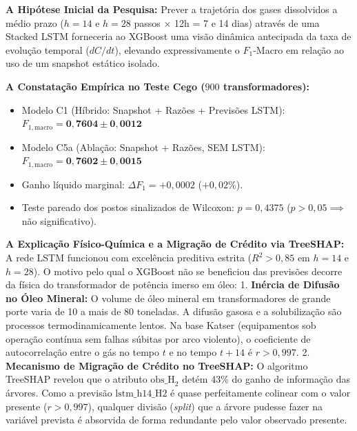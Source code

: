 \documentclass[10pt,a4paper]{article}
\begin{document}
\begin{defesabox}
\textbf{A Hipótese Inicial da Pesquisa:} Prever a trajetória dos gases dissolvidos a médio prazo ($h=14$ e $h=28$ passos $\times$ 12h = 7 e 14 dias) através de uma Stacked LSTM forneceria ao XGBoost uma visão dinâmica antecipada da taxa de evolução temporal ($dC/dt$), elevando expressivamente o $F_1$-Macro em relação ao uso de um snapshot estático isolado.

\textbf{A Constatação Empírica no Teste Cego ($900$ transformadores):}
\begin{itemize}[leftmargin=*,itemsep=1pt]
  \item Modelo C1 (Híbrido: Snapshot + Razões + Previsões LSTM): $F_{1,\text{macro}} = \mathbf{0,7604 \pm 0,0012}$
  \item Modelo C5a (Ablação: Snapshot + Razões, SEM LSTM): $F_{1,\text{macro}} = \mathbf{0,7602 \pm 0,0015}$
  \item Ganho líquido marginal: $\Delta F_1 = +0,0002$ ($+0,02\%$).
  \item Teste pareado dos postos sinalizados de Wilcoxon: $p = 0,4375$ ($p > 0,05 \implies$ não significativo).
\end{itemize}

\textbf{A Explicação Físico-Química e a Migração de Crédito via TreeSHAP:}
A rede LSTM funcionou com excelência preditiva estrita ($R^2 > 0,85$ em $h=14$ e $h=28$). O motivo pelo qual o XGBoost não se beneficiou das previsões decorre da física do transformador de potência imerso em óleo:
1. \textbf{Inércia de Difusão no Óleo Mineral:} O volume de óleo mineral em transformadores de grande porte varia de 10 a mais de 80 toneladas. A difusão gasosa e a solubilização são processos termodinamicamente lentos. Na base Katser (equipamentos sob operação contínua sem falhas súbitas por arco violento), o coeficiente de autocorrelação entre o gás no tempo $t$ e no tempo $t+14$ é $r > 0,997$.
2. \textbf{Mecanismo de Migração de Crédito no TreeSHAP:} O algoritmo TreeSHAP revelou que o atributo $\text{obs\_H}_2$ detém 43\% do ganho de informação das árvores. Como a previsão $\text{lstm\_h14\_H2}$ é quase perfeitamente colinear com o valor presente ($r > 0,997$), qualquer divisão (\textit{split}) que a árvore pudesse fazer na variável prevista é absorvida de forma redundante pelo valor observado presente.
\end{defesabox}
\end{document}
